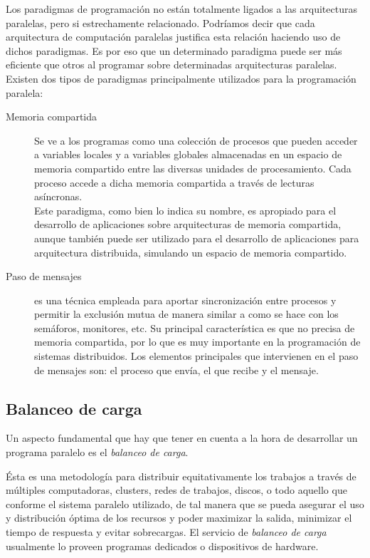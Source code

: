 Los paradigmas de programación no están totalmente ligados a las arquitecturas paralelas, pero si estrechamente relacionado. Podríamos decir
que cada arquitectura de computación paralelas justifica esta relación haciendo uso de dichos paradigmas. Es por eso que un determinado
paradigma puede ser más eficiente que otros al programar  sobre determinadas arquitecturas paralelas. Existen dos tipos de paradigmas
principalmente utilizados para la programación paralela:

    \begin{description}
     \item[Memoria compartida] Se ve a los programas como una colección de procesos que pueden acceder a variables locales y a variables
globales almacenadas en un espacio de memoria compartido entre las diversas unidades de procesamiento. Cada proceso accede a dicha memoria
compartida a través de lecturas asíncronas.\\
Este paradigma, como bien lo indica su nombre, es apropiado para el desarrollo de aplicaciones sobre arquitecturas de memoria compartida,
aunque también puede ser utilizado para el desarrollo de aplicaciones para arquitectura distribuida, simulando un espacio de memoria
compartido.
    \item[Paso de mensajes] es una técnica empleada para aportar sincronización entre procesos y permitir la exclusión mutua de manera
similar a como se hace con los semáforos, monitores, etc. Su principal característica es que no precisa de memoria compartida, por lo que es
muy importante en la programación de sistemas distribuidos. Los elementos principales que intervienen en el paso de mensajes son: el proceso
que envía, el que recibe y el mensaje.
    \end{description}

\subsection{Balanceo de carga}

Un aspecto fundamental que hay que tener en cuenta a la hora de desarrollar un programa paralelo es el \textit{balanceo de carga}.

Ésta es una metodología para distribuir equitativamente los trabajos a través de múltiples computadoras, clusters, redes de trabajos,
discos, o todo aquello que conforme el sistema paralelo utilizado, de tal manera que se pueda asegurar el uso y distribución óptima de los
recursos y poder maximizar la salida, minimizar el tiempo de respuesta y evitar sobrecargas. El servicio de \textit{balanceo de carga}
usualmente lo proveen programas dedicados o dispositivos de hardware\cite{buyya99}.

